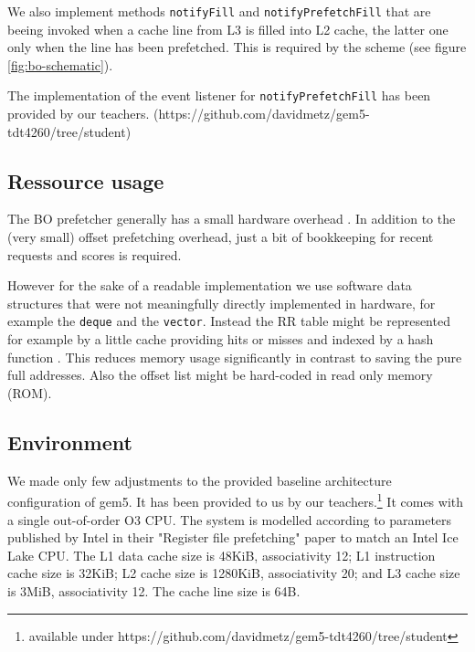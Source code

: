 \documentclass[conference]{IEEEtran}
\begin{document}
We also implement methods \texttt{notifyFill} and \texttt{notifyPrefetchFill} that are beeing invoked
when a cache line from L3 is filled into L2 cache, the latter one only when the line has been prefetched. This is required by the scheme (see figure \ref{fig:bo-schematic}).

The implementation of the event listener for \texttt{notifyPrefetchFill} has been provided by our teachers. (https://github.com/davidmetz/gem5-tdt4260/tree/student)

\subsection{Ressource usage}

The BO prefetcher generally has a small hardware overhead \cite{BOP_2016}.
In addition to the (very small) offset prefetching overhead,
just a bit of bookkeeping for recent requests and scores is required.

However for the sake of a readable implementation we use software data structures that were not meaningfully directly implemented in hardware, for example the \texttt{deque} and the \texttt{vector}.
Instead the RR table might be represented for example by a little cache providing hits or misses and indexed by a hash function \cite{BOP_2016}. This reduces memory usage significantly in contrast to saving the pure full addresses.
Also the offset list might be hard-coded in read only memory (ROM).

\subsection{Environment}

We made only few adjustments to the provided baseline architecture configuration of gem5. It has been provided to us by our teachers.\footnote{available under https://github.com/davidmetz/gem5-tdt4260/tree/student}
It comes with a single out-of-order O3 CPU. The system is modelled according to parameters published by Intel in their "Register file prefetching" paper \cite{intel_register_file_prefetching} to match an Intel Ice Lake CPU.
The L1 data cache size is 48KiB, associativity 12; L1 instruction cache size is 32KiB; L2 cache size is 1280KiB, associativity 20; and L3 cache size is 3MiB, associativity 12.
The cache line size is 64B.
\end{document}

